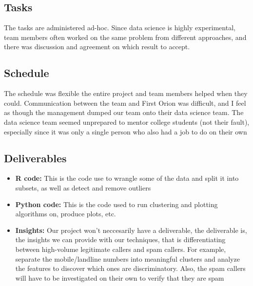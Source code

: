 \documentclass[20pt]{article} %
\begin{document}
\subsection{Tasks}
The tasks are administered ad-hoc.  Since data science is highly experimental, team members often worked on the same problem from different approaches, and there was discussion and agreement on which result to accept.
\subsection{Schedule}
The schedule was flexible the entire project and team members helped when they could.  Communication between the team and First Orion was difficult, and I feel as though the management dumped our team onto their data science team.  The data science team seemed unprepared to mentor college students (not their fault), especially since it was only a single person who also had a job to do on their own
\subsection{Deliverables}
\begin{itemize}
\item \textbf{R code:} This is the code use to wrangle some of the data and split it into subsets, as well as detect and remove outliers
\item \textbf{Python code:} This is the code used to run clustering and plotting algorithms on, produce plots, etc.
\item \textbf{Insights:} Our project won't neccesarily have a deliverable, the deliverable is, the insights we can provide with our techniques, that is differentiating between high-volume legitimate callers and spam callers. For example, separate the mobile/landline numbers into meaningful clusters and analyze the features to discover which ones are discriminatory. Also, the spam callers will have to be investigated on their own to verify that they are spam
\end{itemize}
\end{document}
